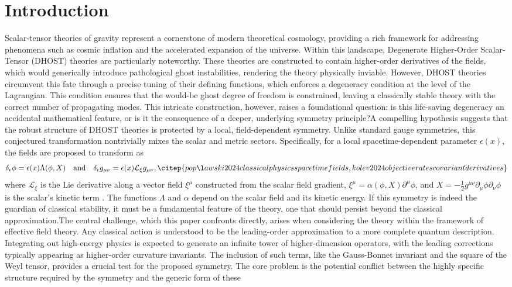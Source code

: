 \documentclass[twocolumn]{aastex631}
\begin{document}
\section{Introduction}
\label{sec:intro}
Scalar-tensor theories of gravity represent a cornerstone of modern theoretical cosmology, providing a rich framework for addressing phenomena such as cosmic inflation and the accelerated expansion of the universe. Within this landscape, Degenerate Higher-Order Scalar-Tensor (DHOST) theories are particularly noteworthy. These theories are constructed to contain higher-order derivatives of the fields, which would generically introduce pathological ghost instabilities, rendering the theory physically inviable. However, DHOST theories circumvent this fate through a precise tuning of their defining functions, which enforces a degeneracy condition at the level of the Lagrangian. This condition ensures that the would-be ghost degree of freedom is constrained, leaving a classically stable theory with the correct number of propagating modes. This intricate construction, however, raises a foundational question: is this life-saving degeneracy an accidental mathematical feature, or is it the consequence of a deeper, underlying symmetry principle?A compelling hypothesis suggests that the robust structure of DHOST theories is protected by a local, field-dependent symmetry. Unlike standard gauge symmetries, this conjectured transformation nontrivially mixes the scalar and metric sectors. Specifically, for a local spacetime-dependent parameter $\epsilon(x)$, the fields are proposed to transform as\begin{equation}\delta_\epsilon \phi = \epsilon(x) \Lambda(\phi, X) \quad \text{and} \quad \delta_\epsilon g_{\mu\nu} = \epsilon(x) \mathcal{L}_{\xi} g_{\mu\nu}, \citep{popławski2024classicalphysicsspacetimefields,kolev2024objectiveratescovariantderivatives}\end{equation}where $\mathcal{L}_{\xi}$ is the Lie derivative along a vector field $\xi^\mu$ constructed from the scalar field gradient, $\xi^\mu = \alpha(\phi, X)\partial^\mu\phi$, and $X = -\frac{1}{2}g^{\mu\nu}\partial_\mu\phi\partial_\nu\phi$ is the scalar's kinetic term  \citep{gao2019higherderivativescalartensortheory,apostolopoulos2023constructingfamilyconformallyflat}. The functions $\Lambda$ and $\alpha$ depend on the scalar field and its kinetic energy. If this symmetry is indeed the guardian of classical stability, it must be a fundamental feature of the theory, one that should persist beyond the classical approximation.The central challenge, which this paper confronts directly, arises when considering the theory within the framework of effective field theory. Any classical action is understood to be the leading-order approximation to a more complete quantum description. Integrating out high-energy physics is expected to generate an infinite tower of higher-dimension operators, with the leading corrections typically appearing as higher-order curvature invariants. The inclusion of such terms, like the Gauss-Bonnet invariant and the square of the Weyl tensor, provides a crucial test for the proposed symmetry. The core problem is the potential conflict between the highly specific structure required by the symmetry and the generic form of these 
\end{document}

